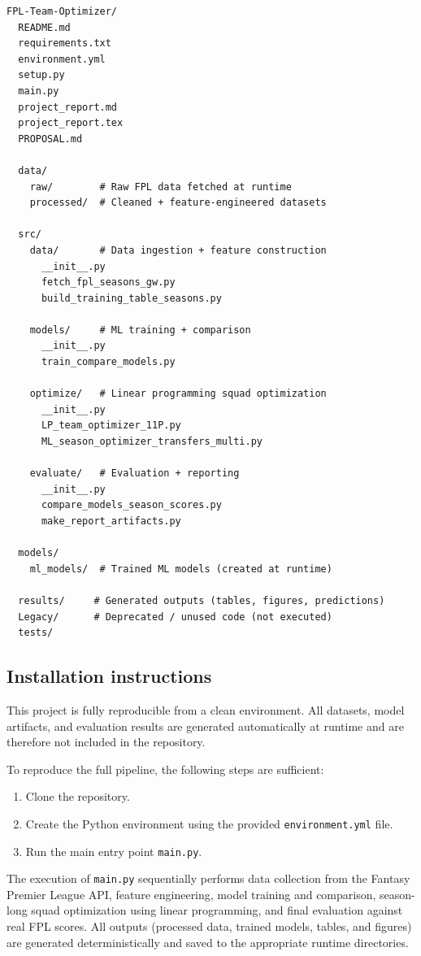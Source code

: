 \documentclass[11pt,a4paper]{article}
\begin{document}
\begin{lstlisting}
FPL-Team-Optimizer/
  README.md
  requirements.txt
  environment.yml
  setup.py
  main.py
  project_report.md
  project_report.tex
  PROPOSAL.md

  data/
    raw/        # Raw FPL data fetched at runtime
    processed/  # Cleaned + feature-engineered datasets

  src/
    data/       # Data ingestion + feature construction
      __init__.py
      fetch_fpl_seasons_gw.py
      build_training_table_seasons.py

    models/     # ML training + comparison
      __init__.py
      train_compare_models.py

    optimize/   # Linear programming squad optimization
      __init__.py
      LP_team_optimizer_11P.py
      ML_season_optimizer_transfers_multi.py

    evaluate/   # Evaluation + reporting
      __init__.py
      compare_models_season_scores.py
      make_report_artifacts.py

  models/
    ml_models/  # Trained ML models (created at runtime)

  results/     # Generated outputs (tables, figures, predictions)
  Legacy/      # Deprecated / unused code (not executed)
  tests/
\end{lstlisting}

\subsection{Installation instructions}
This project is fully reproducible from a clean environment. All datasets, model artifacts, and evaluation results are generated automatically at runtime and are therefore not included in the repository.

To reproduce the full pipeline, the following steps are sufficient:
\begin{enumerate}
    \item Clone the repository.
    \item Create the Python environment using the provided \texttt{environment.yml} file.
    \item Run the main entry point \texttt{main.py}.
\end{enumerate}

The execution of \texttt{main.py} sequentially performs data collection from the Fantasy Premier League API, feature engineering, model training and comparison, season-long squad optimization using linear programming, and final evaluation against real FPL scores. All outputs (processed data, trained models, tables, and figures) are generated deterministically and saved to the appropriate runtime directories.
\end{document}
